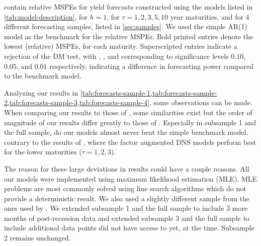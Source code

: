  contain relative MSPEs for yield forecasts constructed using the models listed in \cref{tab:model-description}, for $h = 1$, for $\tau = 1, 2, 3, 5, 10$ year maturities, and for 4 different forecasting samples, listed in \cref{sec:samples}. 
We used the simple AR(1) model as the benchmark for the relative MSPEs. Bold printed entries denote the lowest (relative) MSPEs, for each maturity. 
Superscripted entries indicate a rejection of the DM test, with \sym{*}, \sym{**}, and \sym{***} corresponding to significance levels $0.10$, $0.05$, and $0.01$ respectively, indicating a difference in forecasting power compared to the benchmark model. 

Analyzing our results in \cref{tab:forecasts-sample-1,tab:forecasts-sample-2,tab:forecasts-sample-3,tab:forecasts-sample-4}, some observations can be made. 
When comparing our results to those of \textcite{swanson_big_2017}, some similarities exist but the order of magnitude of our results differ greatly to those of \citeauthor{swanson_big_2017}. 
Especially in subsample 1 and the full sample, do our models almost never beat the simple benchmark model, contrary to the results of \citeauthor{swanson_big_2017}, where the factor augmented DNS models perform best for the lower maturities ($\tau = 1, 2, 3$).

The reason for these large deviations in results could have a couple reasons. All our models were implemented using maximum likelihood estimation (MLE). 
MLE problems are most commonly solved using line search algorithms which do not provide a deterministic result. 
We also used a slightly different sample from the ones used by \citeauthor{swanson_big_2017}. 
We extended subsample 1 and the full sample to include 3 more months of post-recession data and extended subsample 3 and the full sample to include additional data points \citeauthor{swanson_big_2017} did not have access to yet, at the time. 
Subsample 2 remains unchanged.

